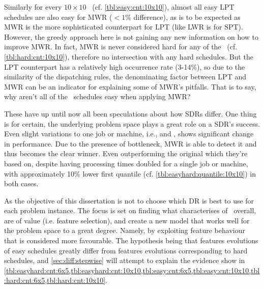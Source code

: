 Similarly for every $10\times10$ \JSP\ (cf. \cref{tbl:easy:cnt:10x10}), almost all easy LPT schedules are also easy  for MWR ($<1\%$ difference), as is to be expected as MWR is the more sophisticated counterpart for LPT (like LWR is for SPT). 
However, the greedy approach here is  not gaining any new information on how to improve MWR. 
In fact, MWR is never considered hard for any of the \JSP\ (cf. \cref{tbl:hard:cnt:10x10}), therefore no intersection with any hard schedules. 
But the LPT counterpart has a relatively high occurrence rate (3-14\%), so due to the similarity of the dispatching rules, the denominating factor between LPT and MWR can be an indicator for explaining some of MWR's pitfalls.
That is to say, why aren't all of the \jsp\ schedules easy when applying MWR? 

These have up until now all been speculations about how SDRs differ. One thing is for certain, the underlying problem space plays a great role on a SDR's success. Even slight variations to one job or machine, i.e.,  and , shows significant change in performance. Due to the presence of bottleneck, MWR is able to detect it and thus becomes the clear winner. Even outperforming the original  which they're based on, despite having processing times doubled for a single job or machine, with approximately 10\% lower first quantile (cf. \cref{tbl:easyhard:quantile:10x10}) in both cases. 

As the objective of this dissertation is not to choose which DR is best to use for each problem instance. 
The focus is set on finding what characterises of \jsp\ overall, are of value (i.e. feature selection), and create a new model that works well for the problem space to a great degree.
Namely, by exploiting feature behaviour that is considered more favourable. The hypothesis being that features evolutions of easy schedules greatly differ from features evolutions corresponding to hard schedules, and \cref{sec:diff:stepwise} will attempt to explain the evidence show in \cref{tbl:easyhard:cnt:6x5,tbl:easyhard:cnt:10x10,tbl:easy:cnt:6x5,tbl:easy:cnt:10x10,tbl:hard:cnt:6x5,tbl:hard:cnt:10x10}.

